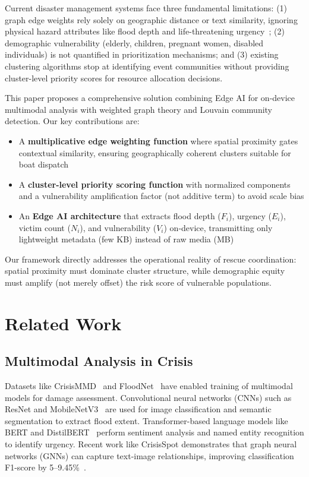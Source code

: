 \documentclass[runningheads]{llncs}
\begin{document}
Current disaster management systems face three fundamental limitations: (1) graph edge weights rely solely on geographic distance or text similarity, ignoring physical hazard attributes like flood depth and life-threatening urgency~\cite{blondel2008louvain}; (2) demographic vulnerability (elderly, children, pregnant women, disabled individuals) is not quantified in prioritization mechanisms; and (3) existing clustering algorithms stop at identifying event communities without providing cluster-level priority scores for resource allocation decisions.

This paper proposes a comprehensive solution combining Edge AI for on-device multimodal analysis with weighted graph theory and Louvain community detection. Our key contributions are:
\begin{itemize}
\item A \textbf{multiplicative edge weighting function} where spatial proximity gates contextual similarity, ensuring geographically coherent clusters suitable for boat dispatch
\item A \textbf{cluster-level priority scoring function} with normalized components and a vulnerability amplification factor (not additive term) to avoid scale bias
\item An \textbf{Edge AI architecture} that extracts flood depth ($F_i$), urgency ($E_i$), victim count ($N_i$), and vulnerability ($V_i$) on-device, transmitting only lightweight metadata (few KB) instead of raw media (MB)
\end{itemize}

Our framework directly addresses the operational reality of rescue coordination: spatial proximity must dominate cluster structure, while demographic equity must amplify (not merely offset) the risk score of vulnerable populations.

\section{Related Work}

\subsection{Multimodal Analysis in Crisis}

Datasets like CrisisMMD~\cite{alam2018crisismmd} and FloodNet~\cite{rahnemoonfar2021floodnet} have enabled training of multimodal models for damage assessment. Convolutional neural networks (CNNs) such as ResNet and MobileNetV3~\cite{howard2019mobilenetv3} are used for image classification and semantic segmentation to extract flood extent. Transformer-based language models like BERT and DistilBERT~\cite{sanh2019distilbert} perform sentiment analysis and named entity recognition to identify urgency. Recent work like CrisisSpot demonstrates that graph neural networks (GNNs) can capture text-image relationships, improving classification F1-score by 5--9.45\%~\cite{ofli2020multimodal}.
\end{document}
